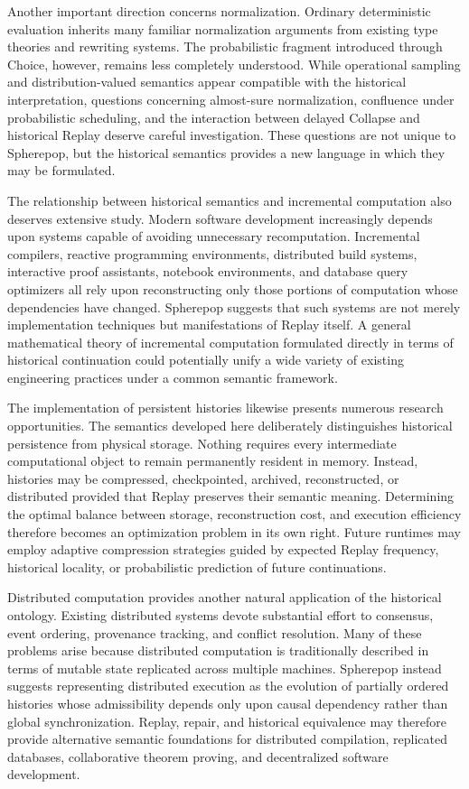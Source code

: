 \documentclass[12pt,oneside]{article}
\theoremstyle{definition}
\theoremstyle{remark}
\begin{document}
Another important direction concerns normalization. Ordinary deterministic
evaluation inherits many familiar normalization arguments from existing type
theories and rewriting systems. The probabilistic fragment introduced through
Choice, however, remains less completely understood. While operational
sampling and distribution-valued semantics appear compatible with the
historical interpretation, questions concerning almost-sure normalization,
confluence under probabilistic scheduling, and the interaction between delayed
Collapse and historical Replay deserve careful investigation. These questions
are not unique to Spherepop, but the historical semantics provides a new
language in which they may be formulated.

The relationship between historical semantics and incremental computation also
deserves extensive study. Modern software development increasingly depends
upon systems capable of avoiding unnecessary recomputation. Incremental
compilers, reactive programming environments, distributed build systems,
interactive proof assistants, notebook environments, and database query
optimizers all rely upon reconstructing only those portions of computation
whose dependencies have changed. Spherepop suggests that such systems are not
merely implementation techniques but manifestations of Replay itself. A
general mathematical theory of incremental computation formulated directly in
terms of historical continuation could potentially unify a wide variety of
existing engineering practices under a common semantic framework.

The implementation of persistent histories likewise presents numerous research
opportunities. The semantics developed here deliberately distinguishes
historical persistence from physical storage. Nothing requires every
intermediate computational object to remain permanently resident in memory.
Instead, histories may be compressed, checkpointed, archived, reconstructed,
or distributed provided that Replay preserves their semantic meaning.
Determining the optimal balance between storage, reconstruction cost, and
execution efficiency therefore becomes an optimization problem in its own
right. Future runtimes may employ adaptive compression strategies guided by
expected Replay frequency, historical locality, or probabilistic prediction of
future continuations.

Distributed computation provides another natural application of the historical
ontology. Existing distributed systems devote substantial effort to consensus,
event ordering, provenance tracking, and conflict resolution. Many of these
problems arise because distributed computation is traditionally described in
terms of mutable state replicated across multiple machines. Spherepop instead
suggests representing distributed execution as the evolution of partially
ordered histories whose admissibility depends only upon causal dependency
rather than global synchronization. Replay, repair, and historical
equivalence may therefore provide alternative semantic foundations for
distributed compilation, replicated databases, collaborative theorem proving,
and decentralized software development.
\end{document}
